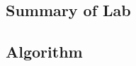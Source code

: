 \documentclass[12pt]{article}
\begin{document}
\begin{center}
\section{Summary of Lab}
\end{center}
\subsection{Algorithm}
\end{document}
